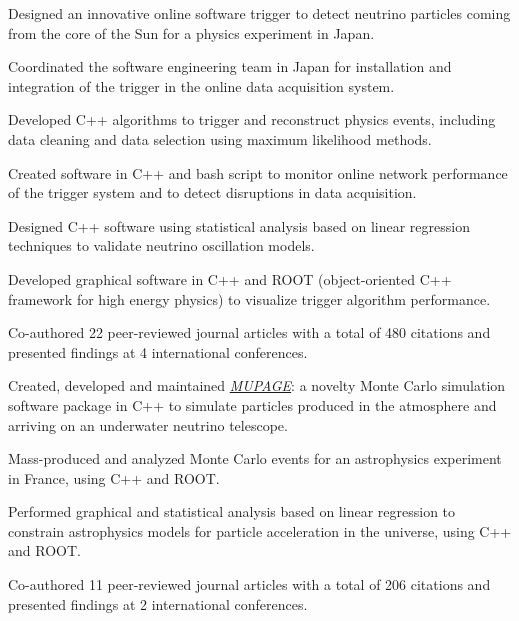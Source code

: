 \documentclass[letterpaper]{deedy-resume} %
\begin{document}
\begin{minipage}[t]{0.66\textwidth}
\begin{tightitemize}
\item Designed an innovative online software trigger to detect neutrino particles coming from the core of the Sun for a physics experiment in Japan.
\item Coordinated the software engineering team in Japan for installation and integration of the trigger in the online data acquisition system.
\item Developed C++ algorithms to trigger and reconstruct physics events, including data cleaning and data selection using maximum likelihood methods.
\item Created software in C++ and bash script to monitor online network performance of the trigger system and to detect disruptions in data acquisition.
\item Designed C++ software using statistical analysis based on linear regression techniques to validate neutrino oscillation models.
\item Developed graphical software in C++ and ROOT (object-oriented C++ framework for high energy physics) to visualize trigger algorithm performance. 
\item Co-authored 22 peer-reviewed journal articles with a total of 480 citations and presented findings at 4 international conferences. 
\end{tightitemize}

\sectionspace %



\begin{tightitemize}
\item Created, developed and maintained \href{https://github.com/giadac/MUPAGE}{\textit{MUPAGE}}: a novelty Monte Carlo simulation software package in C++ to simulate particles produced in the atmosphere and arriving on an underwater neutrino telescope.
\item Mass-produced and analyzed Monte Carlo events for an astrophysics experiment in France, using C++ and ROOT. 
\item Performed graphical and statistical analysis based on linear regression to constrain astrophysics models for particle acceleration in the universe, using C++ and ROOT.
\item Co-authored 11 peer-reviewed journal articles with a total of 206 citations and presented findings at 2 international conferences.
\end{tightitemize}


\end{minipage}
\end{document}
